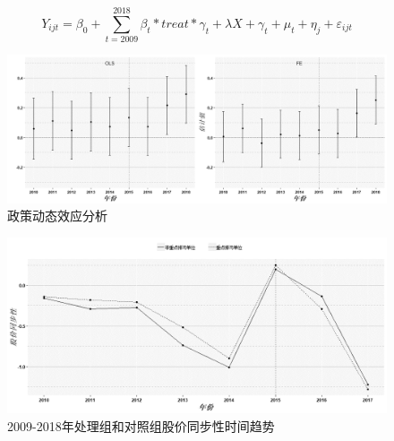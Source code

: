 \documentclass{beamer}	%
\theoremstyle{plain}
\theoremstyle{definition}
\theoremstyle{remark}
\numberwithin{equation}{section}
\begin{document}
\begin{frame}
	\[Y_{ijt}=\beta_0+\sum_{t=2009}^{2018}{\beta_t*treat*\gamma_t}+\lambda X+\gamma_t+\mu_t+\eta_j+\varepsilon_{ijt}\]
	\begin{figure}[htbp]
		\begin{center}
			\includegraphics[scale=0.35]{img/t4.png}
			\caption{政策动态效应分析}
			\label{政策动态效应分析}
		\end{center}
	\end{figure}
\end{frame}

\begin{frame}
	\begin{figure}[htbp]
		\begin{center}
			\includegraphics[scale=0.4]{img/t5.png}
			\caption{2009-2018年处理组和对照组股价同步性时间趋势}
			\label{机制分析——图}
		\end{center}
	\end{figure}
\end{frame}
\end{document}
